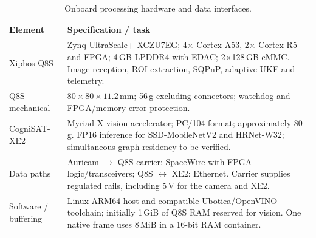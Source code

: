 \documentclass[11pt,a4paper]{article}
\renewcommand{\arraystretch}{1.3}
\begin{document}
\begin{table}[H]
\centering\small
\renewcommand{\arraystretch}{1.45}
\setlength{\tabcolsep}{6pt}
\caption{Onboard processing hardware and data interfaces.}
\label{tab:ml_cv_processing}
\begin{tabularx}{\linewidth}{|>{\raggedright\arraybackslash}p{3.6cm}|>{\raggedright\arraybackslash}X|}
\hline
\rowcolor{black!8}
\textbf{Element} & \textbf{Specification / task} \\
\hline
Xiphos Q8S & Zynq UltraScale+ XCZU7EG; 4$\times$ Cortex-A53, 2$\times$ Cortex-R5 and FPGA; 4\,GB LPDDR4 with EDAC; 2$\times$128\,GB eMMC. Image reception, ROI extraction, SQPnP, adaptive UKF and telemetry. \\
\hline
Q8S mechanical & $80\times80\times11.2$\,mm; 56\,g excluding connectors; watchdog and FPGA/memory error protection. \\
\hline
CogniSAT-XE2 & Myriad X vision accelerator; PC/104 format; approximately 80\,g. FP16 inference for SSD-MobileNetV2 and HRNet-W32; simultaneous graph residency to be verified. \\
\hline
Data paths & Auricam $\rightarrow$ Q8S carrier: SpaceWire with FPGA logic/transceivers; Q8S $\leftrightarrow$ XE2: Ethernet. Carrier supplies regulated rails, including 5\,V for the camera and XE2. \\
\hline
Software / buffering & Linux ARM64 host and compatible Ubotica/OpenVINO toolchain; initially 1\,GiB of Q8S RAM reserved for vision. One native frame uses 8\,MiB in a 16-bit RAM container. \\
\hline
\end{tabularx}
\end{table}
\end{document}

